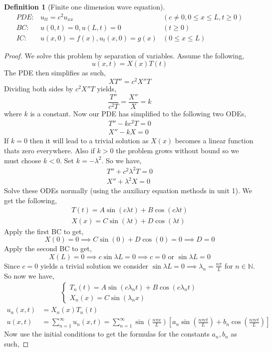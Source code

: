 \documentclass[oneside,11pt,pdftex,final]{book}%
\numberwithin{equation}{section}
\newtheorem{definition}[theorem]{Definition}
\numberwithin{section}{chapter}
\numberwithin{equation}{chapter}
\newcommand{\N}{\mathbb{N}}
\begin{document}
\begin{definition}[Finite one dimension wave equation]
	\begin{align*}
		PDE:& u_{tt}=c^2u_{xx} &(c \neq 0, 0\leq x \leq L, t\geq0)\\
		BC:& u(0,t)=0, u(L,t)=0 &(t\geq0)\\
		IC:& u(x,0)=f(x), u_t(x,0)=g(x) &(0\leq x \leq L)
	\end{align*}
\end{definition}
\begin{proof}
	We solve this problem by separation of variables. Assume the following,
	\[ u(x,t) =X(x)T(t)\]
	The PDE then simplifies as such,
	\[ XT''=c^2X''T \]
	Dividing both sides by $ c^2X''T $ yields,
	\[ \frac{T''}{c^2T}=\frac{X''}{X} =k\]
	where $ k $ is a constant. Now our PDE has simplified to the following two ODEs,
	\begin{align*}
			T''-kc^2T=0\\
			X''-kX=0
	\end{align*}
If $ k=0 $ then it will lead to a trivial solution as $ X(x) $ becomes a linear function thats zero everywhere. Also if $ k>0 $ the problem grows without bound so we must choose $ k<0 $. Set $ k=-\lambda^2 $. So we have,
\begin{align*}
	T''+c^2\lambda^2T=0\\
	X''+\lambda^2X=0
\end{align*}
Solve these ODEs normally (using the auxiliary equation methods in unit 1). We get the following,
\begin{align*}
		T(t)=A \sin (c\lambda t)+B\cos(c \lambda t)\\
		X(x)=C \sin(\lambda t)+D\cos (\lambda t)
\end{align*}
Apply the first BC to get,
\[ X(0)=0\implies C \sin(0)+D \cos(0)=0\implies D=0 \]
Apply the second BC to get,
\[ X(L)=0\implies c\sin\lambda L=0 \implies c=0 \text{ or } \sin\lambda L=0 \]
Since $ c=0 $ yields a trivial solution we consider $ \sin \lambda L=0 \implies \lambda_n=\frac{n \pi }{L} $ for $ n\in \N  $. So now we have,
\begin{align*}
	\begin{cases}
		T_n(t)=A \sin (c \lambda_n t)+ B \cos (c \lambda_n t)\\
		X_n(x)=C \sin (\lambda_nx)
	\end{cases}
\end{align*}
\begin{align*}
	u_n(x,t)&=X_n(x)T_n(t)\\
	u(x,t)&=\sum_{n=1}^\infty u_n(x,t)=\sum_{n=1}^\infty \sin \left( \frac{n \pi x}{L}\right) \left[a_n \sin \left(\frac{n \pi ct}{L}\right)+b_n \cos\left(\frac{n \pi ct}{L}\right)\right]
\end{align*}
Now use the initial conditions to get the formulas for the constants $ a_n, b_n $ as such,


\end{proof}
\end{document}
